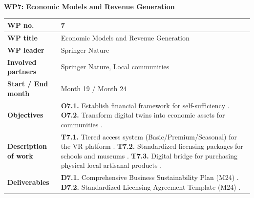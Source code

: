 \textbf{WP7: Economic Models and Revenue Generation}
\begin{table}[H]
\centering
\small
\renewcommand{\arraystretch}{1.2}
\begin{tabularx}{\textwidth}{|l|X|}
\hline
\rowcolor{gray!10} \textbf{WP no.} & 7 \\ \hline
\textbf{WP title} & Economic Models and Revenue Generation  \\ \hline
\textbf{WP leader} & Springer Nature  \\ \hline
\textbf{Involved partners} & Springer Nature, Local communities  \\ \hline
\textbf{Start / End month} & Month 19 / Month 24  \\ \hline
\textbf{Objectives} & \textbf{O7.1.} Establish financial framework for self-sufficiency . \newline \textbf{O7.2.} Transform digital twins into economic assets for communities . \\ \hline
\textbf{Description of work} & \textbf{T7.1.} Tiered access system (Basic/Premium/Seasonal) for the VR platform . \newline \textbf{T7.2.} Standardized licensing packages for schools and museums . \newline \textbf{T7.3.} Digital bridge for purchasing physical local artisanal products . \\ \hline
\textbf{Deliverables} & \textbf{D7.1.} Comprehensive Business Sustainability Plan (M24) . \newline \textbf{D7.2.} Standardized Licensing Agreement Template (M24) . \\ \hline
\end{tabularx}
\end{table}